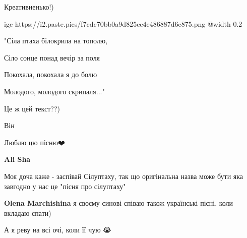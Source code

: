  
 
 
 
 

\qqSecCmt


Креативненько!)


\ifcmt
  igc https://i2.paste.pics/f7cdc70bb0a9d825cc4e486887d6e875.png
	@width 0.2
\fi


"Сіла птаха білокрила на тополю,\par
Сіло сонце понад вечір за поля\par
Покохала, покохала я до болю\par
Молодого, молодого скрипаля..."\par
Це ж цей текст??)\par

\begin{itemize} %

Він


Люблю цю пісню❤️

\textbf{Ali Sha} 

Моя доча каже - заспівай Сілуптаху, так що оригінальна назва може бути яка
завгодно у нас це "пісня про сілуптаху"

\textbf{Olena Marchishina} я своєму синові співаю також українські пісні, коли вкладаю спати)


А я реву на всі очі, коли її чую 😭
\end{itemize} %
